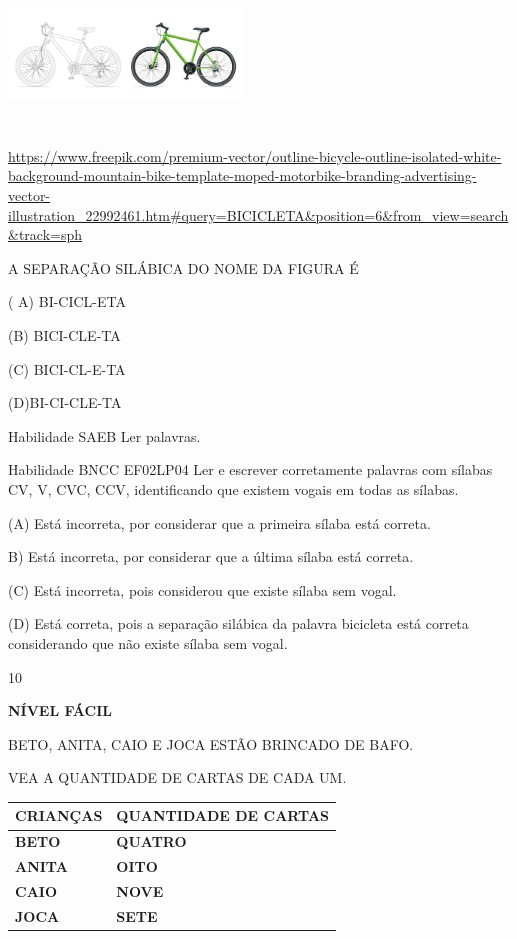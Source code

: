 {{\includegraphics[width=2.46250in,height=1.54444in]{media/image180.jpeg}

\url{https://www.freepik.com/premium-vector/outline-bicycle-outline-isolated-white-background-mountain-bike-template-moped-motorbike-branding-advertising-vector-illustration_22992461.htm\#query=BICICLETA\&position=6\&from_view=search\&track=sph}

A SEPARAÇÃO SILÁBICA DO NOME DA FIGURA É

( A) BI-CICL-ETA

(B) BICI-CLE-TA

(C) BICI-CL-E-TA

(D)BI-CI-CLE-TA

Habilidade SAEB Ler palavras.

Habilidade BNCC EF02LP04 Ler e escrever corretamente palavras com
sílabas CV, V, CVC, CCV, identificando que existem vogais em todas as
sílabas.

(A) Está incorreta, por considerar que a primeira sílaba está correta.

B) Está incorreta, por considerar que a última sílaba está correta.

(C) Está incorreta, pois considerou que existe sílaba sem vogal.

(D) Está correta, pois a separação silábica da palavra bicicleta está
correta considerando que não existe sílaba sem vogal.

\num{10}

\textbf{NÍVEL FÁCIL}

BETO, ANITA, CAIO E JOCA ESTÃO BRINCADO DE BAFO.

VEA A QUANTIDADE DE CARTAS DE CADA UM.

\begin{longtable}[]{@{}ll@{}}
\toprule
\textbf{CRIANÇAS} & \textbf{QUANTIDADE DE CARTAS}\tabularnewline
\midrule
\endhead
\textbf{BETO} & \textbf{QUATRO}\tabularnewline
\textbf{ANITA} & \textbf{OITO}\tabularnewline
\textbf{CAIO} & \textbf{NOVE}\tabularnewline
\textbf{JOCA} & \textbf{SETE}\tabularnewline
\bottomrule
\end{longtable}

}}
